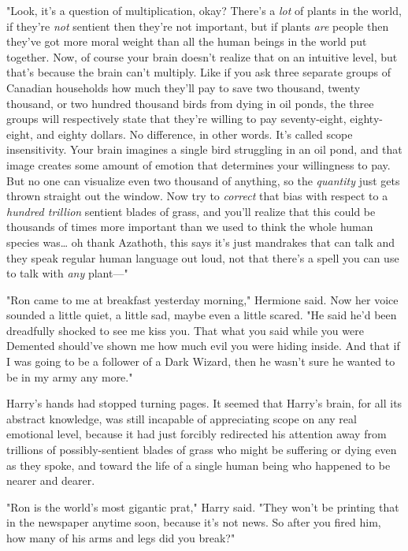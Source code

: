 "Look, it's a question of multiplication, okay? There's a \emph{lot} of plants
in the world, if they're \emph{not} sentient then they're not important, but if
plants \emph{are} people then they've got more moral weight than all the human
beings in the world put together. Now, of course your brain doesn't realize
that on an intuitive level, but that's because the brain can't multiply. Like
if you ask three separate groups of Canadian households how much they'll pay to
save two thousand, twenty thousand, or two hundred thousand birds from dying in
oil ponds, the three groups will respectively state that they're willing to pay
seventy-eight, eighty-eight, and eighty dollars. No difference, in other words.
It's called scope insensitivity. Your brain imagines a single bird struggling
in an oil pond, and that image creates some amount of emotion that determines
your willingness to pay. But no one can visualize even two thousand of
anything, so the \emph{quantity} just gets thrown straight out the window. Now
try to \emph{correct} that bias with respect to a \emph{hundred trillion}
sentient blades of grass, and you'll realize that this could be thousands of
times more important than we used to think the whole human species was{\ldots}
oh thank Azathoth, this says it's just mandrakes that can talk and they speak
regular human language out loud, not that there's a spell you can use to talk
with \emph{any} plant---"

"Ron came to me at breakfast yesterday morning," Hermione said. Now her voice
sounded a little quiet, a little sad, maybe even a little scared. "He said he'd
been dreadfully shocked to see me kiss you. That what you said while you were
Demented should've shown me how much evil you were hiding inside. And that if I
was going to be a follower of a Dark Wizard, then he wasn't sure he wanted to
be in my army any more."

Harry's hands had stopped turning pages. It seemed that Harry's brain, for all
its abstract knowledge, was still incapable of appreciating scope on any real
emotional level, because it had just forcibly redirected his attention away
from trillions of possibly-sentient blades of grass who might be suffering or
dying even as they spoke, and toward the life of a single human being who
happened to be nearer and dearer.

"Ron is the world's most gigantic prat," Harry said. "They won't be printing
that in the newspaper anytime soon, because it's not news. So after you fired
him, how many of his arms and legs did you break?"

